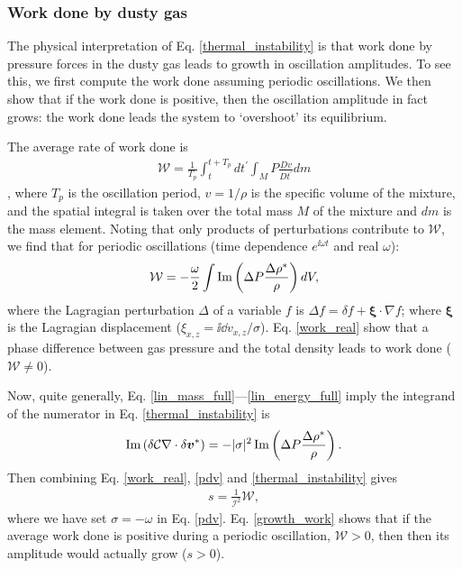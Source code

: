 

\subsubsection{Work done by dusty gas} 

The physical interpretation of Eq. \ref{thermal_instability} is that 
work done by pressure forces in the dusty gas leads to growth in
oscillation amplitudes. To see this, we first compute the work done
assuming periodic oscillations. We then show that if the work done is positive, then the
oscillation amplitude in fact grows: the work done leads the
system to `overshoot' its equilibrium. 

The average rate of work done is 
\begin{align}
  \mathcal{W} = \frac{1}{T_p}\int^{t+T_p}_{t}dt^\prime\int_M P
  \frac{Dv}{Dt^\prime} dm \label{work_def} 
\end{align}
\citep{cox67}, 
where $T_p$ is the oscillation period, $v=1/\rho$ is the specific
volume of the mixture, and the spatial integral is taken over the
total mass $M$ of the mixture and $dm$ is the mass element. 
Noting that only products of perturbations contribute to
$\mathcal{W}$, we find that for periodic oscillations (time dependence 
$e^{\ii\omega t}$ and real $\omega$): 
\begin{align}
  \mathcal{W} = - \frac{\omega}{2} \int \operatorname{Im}\left(\Delta P
  \frac{\Delta \rho^*}{\rho}\right)dV,\label{work_real}
\end{align}
where %
 the Lagragian perturbation $\Delta$ of a variable $f$ is 
$\Delta f = \delta f + \bm{\xi}\cdot\nabla f$; where $\bm{\xi}$ is the
Lagragian displacement ($    \xi_{x,z} =  \ii \dd v_{x,z}/\sigma$).  
Eq. \ref{work_real} show that a phase difference between gas pressure and
the total density leads to work done
($\mathcal{W}\neq0$).  

Now, quite generally, Eq. \ref{lin_mass_full}---\ref{lin_energy_full} 
imply the integrand of the numerator in Eq. \ref{thermal_instability} 
is 
\begin{align} 
  \operatorname{Im} \left(\delta \mathcal{C}
  \nabla\cdot\delta \bm{v}^*\right) = 
  -|\sigma|^2\operatorname{Im} \left(\Delta P 
  \frac{\Delta\rho^*}{\rho}\right). \label{pdv}
\end{align}
Then combining Eq. \ref{work_real}, \ref{pdv} and
\ref{thermal_instability} 
gives  
\begin{align}
s = \frac{1}{\mathcal{I}^2}\mathcal{W}, \label{growth_work}
\end{align}
where we have set $\sigma= - \omega$ in 
Eq. \ref{pdv}. Eq. \ref{growth_work} shows that if the average work
done is positive during a periodic oscillation, $\mathcal{W}>0$, then
then its amplitude would actually grow ($s>0$).  

